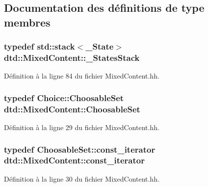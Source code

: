\subsection{Documentation des définitions de type membres}
\hypertarget{classdtd_1_1_mixed_content_af406cf95bf434a84082758aab801296d}{
\subsubsection[{\_\-StatesStack}]{\setlength{\rightskip}{0pt plus 5cm}typedef std::stack$<${\bf \_\-State}$>$ {\bf dtd::MixedContent::\_\-StatesStack}}}
\label{classdtd_1_1_mixed_content_af406cf95bf434a84082758aab801296d}


Définition à la ligne 84 du fichier MixedContent.hh.

\hypertarget{classdtd_1_1_mixed_content_ab8f0c26935279ce90ebb5bb22b244088}{
\subsubsection[{ChoosableSet}]{\setlength{\rightskip}{0pt plus 5cm}typedef {\bf Choice::ChoosableSet} {\bf dtd::MixedContent::ChoosableSet}}}
\label{classdtd_1_1_mixed_content_ab8f0c26935279ce90ebb5bb22b244088}


Définition à la ligne 29 du fichier MixedContent.hh.

\hypertarget{classdtd_1_1_mixed_content_a801684f467b642e9e2de6297585ccf7b}{
\subsubsection[{const\_\-iterator}]{\setlength{\rightskip}{0pt plus 5cm}typedef ChoosableSet::const\_\-iterator {\bf dtd::MixedContent::const\_\-iterator}}}
\label{classdtd_1_1_mixed_content_a801684f467b642e9e2de6297585ccf7b}


Définition à la ligne 30 du fichier MixedContent.hh.




